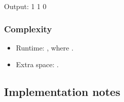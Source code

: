 \documentclass[letterpaper,12pt,english]{book}
\begin{document}
\begin{sphinxVerbatim}[commandchars=\\\{\}]
\end{sphinxVerbatim}

\begin{sphinxVerbatim}[commandchars=\\\{\}]
Output:
1
1
0
\end{sphinxVerbatim}


\subsubsection{Complexity}
\label{\detokenize{Stack/844_Backspace_String_Compare:complexity}}\begin{itemize}
\item {} 
\sphinxAtStartPar
Runtime: , where .

\item {} 
\sphinxAtStartPar
Extra space: .

\end{itemize}


\subsection{Implementation notes}
\label{\detokenize{Stack/844_Backspace_String_Compare:implementation-notes}}
\end{document}
